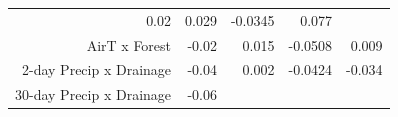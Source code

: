 \documentclass[]{article}
\begin{document}
\begin{longtable}[c]{@{}rrrrr@{}}
\begin{minipage}[t]{0.08\columnwidth}
0.02
\strut\end{minipage} &
\begin{minipage}[t]{0.07\columnwidth}\raggedleft\strut
0.029
\strut\end{minipage} &
\begin{minipage}[t]{0.10\columnwidth}\raggedleft\strut
-0.0345
\strut\end{minipage} &
\begin{minipage}[t]{0.10\columnwidth}\raggedleft\strut
0.077
\strut\end{minipage}\tabularnewline
\begin{minipage}[t]{0.37\columnwidth}\raggedleft\strut
AirT x Forest
\strut\end{minipage} &
\begin{minipage}[t]{0.08\columnwidth}\raggedleft\strut
-0.02
\strut\end{minipage} &
\begin{minipage}[t]{0.07\columnwidth}\raggedleft\strut
0.015
\strut\end{minipage} &
\begin{minipage}[t]{0.10\columnwidth}\raggedleft\strut
-0.0508
\strut\end{minipage} &
\begin{minipage}[t]{0.10\columnwidth}\raggedleft\strut
0.009
\strut\end{minipage}\tabularnewline
\begin{minipage}[t]{0.37\columnwidth}\raggedleft\strut
2-day Precip x Drainage
\strut\end{minipage} &
\begin{minipage}[t]{0.08\columnwidth}\raggedleft\strut
-0.04
\strut\end{minipage} &
\begin{minipage}[t]{0.07\columnwidth}\raggedleft\strut
0.002
\strut\end{minipage} &
\begin{minipage}[t]{0.10\columnwidth}\raggedleft\strut
-0.0424
\strut\end{minipage} &
\begin{minipage}[t]{0.10\columnwidth}\raggedleft\strut
-0.034
\strut\end{minipage}\tabularnewline
\begin{minipage}[t]{0.37\columnwidth}\raggedleft\strut
30-day Precip x Drainage
\strut\end{minipage} &
\begin{minipage}[t]{0.08\columnwidth}\raggedleft\strut
-0.06
\strut\end{minipage} &

\end{longtable}
\end{document}

